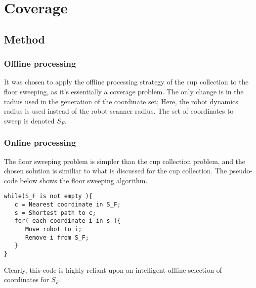 \section{Coverage}
\subsection{Method}
\subsubsection{Offline processing}
It was chosen to apply the offline processing strategy of the cup collection
to the floor sweeping, as it's essentially a coverage problem.
The only change is in the radius used in the generation of the coordinate set;
Here, the robot dynamics radius is used instead of the robot scanner radius.
The set of coordinates to sweep is denoted \(S_{F}\).


\subsubsection{Online processing}
The floor sweeping problem is simpler than the cup collection problem,
and the chosen solution is similiar to what is discussed for the cup collection.
The pseudo-code below shows the floor sweeping algorithm.

\begin{verbatim}
while(S_F is not empty ){
   c = Nearest coordinate in S_F;
   s = Shortest path to c;
   for( each coordinate i in s ){
      Move robot to i;
      Remove i from S_F;
   }
}
\end{verbatim}

Clearly, this code is highly reliant upon an intelligent offline selection of coordinates for \(S_{F}\).